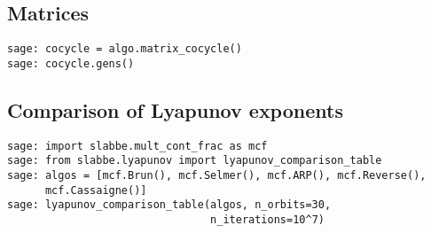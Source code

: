 \subsection{Matrices}
\begin{verbatim}
sage: cocycle = algo.matrix_cocycle()
sage: cocycle.gens()
\end{verbatim}
\subsection{Comparison of Lyapunov exponents}
\begin{verbatim}
sage: import slabbe.mult_cont_frac as mcf
sage: from slabbe.lyapunov import lyapunov_comparison_table
sage: algos = [mcf.Brun(), mcf.Selmer(), mcf.ARP(), mcf.Reverse(),
      mcf.Cassaigne()]
sage: lyapunov_comparison_table(algos, n_orbits=30, 
                                n_iterations=10^7)
\end{verbatim}
